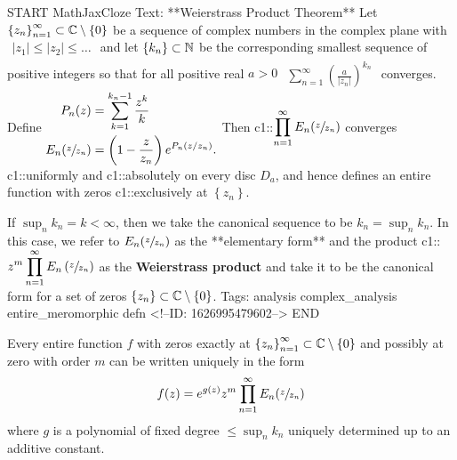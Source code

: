 \documentclass{memoir}
\begin{document}
\begin{anki}
START
MathJaxCloze
Text: **Weierstrass Product Theorem**
Let \(\left\{ z_n \right\}_{n=1}^{\infty} \subset \mathbb{C}\setminus\left\{ 0 \right\} \) be a sequence of complex numbers in the complex plane with
\(\begin{align*}
  	\left| z_1 \right| \leq \left| z_2 \right| \leq \ldots
  \end{align*}\)
and let \(\left\{ k_n \right\} \subset \mathbb{N}\) be the corresponding smallest sequence of positive integers so that for all positive real \(a>0\)
\(\begin{align*}
  	\sum_{n=1}^{\infty} \left( \frac{a}{\left| z_n \right| } \right)^{k_n} 
  \end{align*}\)
converges. Define
\(\begin{align*}
  	P_n(z) &= \sum_{k=1}^{k_n-1} \frac{z^{k}}{k}\\
  	E_n( \sfrac{z}{z_n}) &= \left( 1- \frac{z}{z_n} \right) e^{P_n(z / z_n)} .
  \end{align*}\)
Then
 {{c1::\(\begin{align*}
        	\prod_{n=1}^{\infty} E_n( \sfrac{z }{z_n})   
        \end{align*}\)}} 
converges {{c1::uniformly}} and {{c1::absolutely}} on every disc \(D_a\), and hence defines an entire function with zeros {{c1::exclusively at \(\left\{ z_n \right\} \)}}.

If \(\sup_{n} k_n = k< \infty\), then we take the canonical sequence to be \(k_n = \sup_{n} k_n\). In this case, we refer to \(E_n(\sfrac{z}{z_n})\) as the **elementary form** and the product
{{c1::\( \begin{align*}
        	 z^{m} \prod_{n=1}^{\infty} E_n \left( \sfrac{z}{z_n} \right)
        \end{align*}\)}}
as the \textbf{Weierstrass product} and take it to be the canonical form for a set of zeros \(\left\{ z_n \right\} \subset \mathbb{C}\setminus\left\{ 0 \right\} \).
Tags: analysis complex_analysis entire_meromorphic defn
<!--ID: 1626995479602-->
END
\end{anki}


\begin{cor}
	Every entire function \(f\) with zeros exactly at \(\left\{ z_n \right\}_{n=1}^{\infty}\subset \mathbb{C}\setminus\left\{ 0 \right\}\) and possibly at zero with order \(m\) can be written uniquely in the form
	\begin{align*}
	  	f(z) = e^{g(z)} z^{m} \prod_{n=1}^{\infty} E_n( \sfrac{z}{z_n})
	  \end{align*}
	where \(g\) is a polynomial of fixed degree \(\leq \sup_{n} k_n\) uniquely determined up to an additive constant.
\end{cor}
\end{document}
